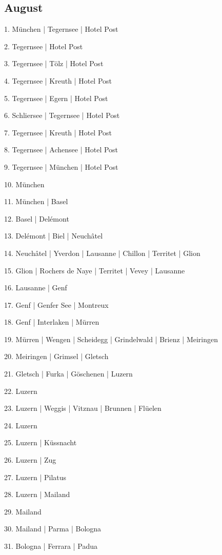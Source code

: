 \documentclass[twoside=false,titlepage=false,open=any, parskip=never, fontsize=10pt, headings=small, chapterprefix=false, appendixprefix=false, DIV=15]{scrbook}
\begin{document}
\begin{multicols}{3}
            \section*{August}
            1. München | Tegernsee | Hotel Post\par
            2. Tegernsee | Hotel Post\par
            3. Tegernsee | Tölz | Hotel Post\par
            4. Tegernsee | Kreuth | Hotel Post\par
            5. Tegernsee | Egern | Hotel Post\par
            6. Schliersee | Tegernsee | Hotel Post\par
            7. Tegernsee | Kreuth | Hotel Post\par
            8. Tegernsee | Achensee | Hotel Post\par
            9. Tegernsee | München | Hotel Post\par
            10. München\par
            11. München | Basel\par
            12. Basel | Delémont\par
            13. Delémont | Biel | Neuchâtel\par
            14. Neuchâtel | Yverdon | Lausanne | Chillon | Territet | Glion\par
            15. Glion | Rochers de Naye | Territet | Vevey | Lausanne\par
            16. Lausanne | Genf\par
            17. Genf | Genfer See | Montreux\par
            18. Genf | Interlaken | Mürren\par
            19. Mürren | Wengen | Scheidegg | Grindelwald | Brienz | Meiringen\par
            20. Meiringen | Grimsel | Gletsch\par
            21. Gletsch | Furka | Göschenen | Luzern\par
            22. Luzern\par
            23. Luzern | Weggis | Vitznau | Brunnen | Flüelen\par
            24. Luzern\par
            25. Luzern | Küssnacht\par
            26. Luzern | Zug\par
            27. Luzern | Pilatus\par
            28. Luzern | Mailand\par
            29. Mailand\par
            30. Mailand | Parma | Bologna\par
            31. Bologna | Ferrara | Padua\par

\end{multicols}
\end{document}
